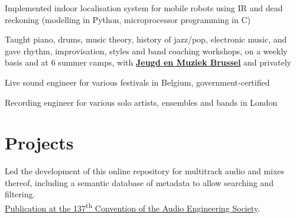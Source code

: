 \documentclass[letterpaper]{deedy-resume} %
\begin{document}
{\begin{minipage}[t]{0.66\textwidth}

\hspace{-0.1cm} 
\begin{tightitemize}
\item Implemented indoor localisation system for mobile robots using IR and dead reckoning (modelling in Python, microprocessor programming in C)
\end{tightitemize}



\hspace{-0.1cm}
\begin{tightitemize}
\item Taught piano, drums, music theory, history of jazz/pop, electronic music, and gave rhythm, improvisation, styles and band coaching workshops, on a weekly basis and at 6 summer camps, with \href{http://www.jeugdenmuziekbrussel.be}{\textbf{Jeugd en Muziek Brussel}} and privately
\item Live sound engineer for various festivals in Belgium, government-certified
\item Recording engineer for various solo artists, ensembles and bands in London
\end{tightitemize}



\section{Projects}

\hspace{-0.1cm}

Led the development of this online repository for multitrack audio and mixes thereof, including a semantic database of metadata to allow searching and filtering. \\
\href{http://www.brechtdeman.com/downloads/aes137.pdf}{Publication at the 137\textsuperscript{th} Convention of the Audio Engineering Society}. 


\end{minipage}}
\end{document}

